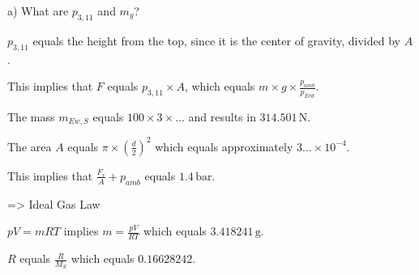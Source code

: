 a) What are \( p_{3,11} \) and \( m_g \)?

\( p_{3,11} \) equals the height from the top, since it is the center of gravity, divided by \( A \).

This implies that \( F \) equals \( p_{3,11} \times A \), which equals \( m \times g \times \frac{p_{amb}}{p_{Erd}} \).

The mass \( m_{Ew, S} \) equals \( 100 \times 3 \times \ldots \) and results in \( 314.501 \, \text{N} \).

The area \( A \) equals \( \pi \times \left(\frac{d}{2}\right)^2 \) which equals approximately \( 3 \ldots \times 10^{-4} \).

This implies that \( \frac{F_r}{A} + p_{amb} \) equals \( 1.4 \, \text{bar} \).

=> Ideal Gas Law

\( pV = mRT \) implies \( m = \frac{pV}{RT} \) which equals \( 3.418241 \, \text{g} \).

\( R \) equals \( \frac{R}{M_S} \) which equals \( 0.16628242 \).